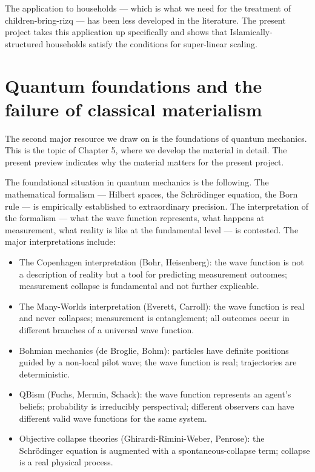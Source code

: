 The application to households --- which is what we need for the
treatment of children-bring-rizq --- has been less developed in the
literature. The present project takes this application up
specifically and shows that Islamically-structured households
satisfy the conditions for super-linear scaling.

\section{Quantum foundations and the failure of classical materialism}
\label{sec:quantum-foundations-prelim}

The second major resource we draw on is the foundations of quantum
mechanics. This is the topic of Chapter 5, where we develop the
material in detail. The present preview indicates why the material
matters for the present project.

The foundational situation in quantum mechanics is the following.
The mathematical formalism --- Hilbert spaces, the Schr\"odinger
equation, the Born rule --- is empirically established to
extraordinary precision. The interpretation of the formalism --- what
the wave function represents, what happens at measurement, what
reality is like at the fundamental level --- is contested. The major
interpretations include:

\begin{itemize}[leftmargin=2em]
    \item The Copenhagen interpretation (Bohr, Heisenberg): the
    wave function is not a description of reality but a tool for
    predicting measurement outcomes; measurement collapse is
    fundamental and not further explicable.
    \item The Many-Worlds interpretation (Everett, Carroll): the
    wave function is real and never collapses; measurement is
    entanglement; all outcomes occur in different branches of a
    universal wave function.
    \item Bohmian mechanics (de Broglie, Bohm): particles have
    definite positions guided by a non-local pilot wave; the wave
    function is real; trajectories are deterministic.
    \item QBism (Fuchs, Mermin, Schack): the wave function
    represents an agent's beliefs; probability is irreducibly
    perspectival; different observers can have different valid wave
    functions for the same system.
    \item Objective collapse theories (Ghirardi-Rimini-Weber,
    Penrose): the Schr\"odinger equation is augmented with a
    spontaneous-collapse term; collapse is a real physical process.
\end{itemize}


